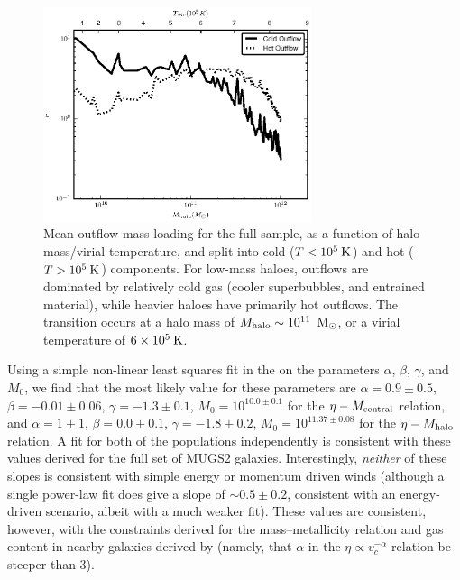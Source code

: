 \begin{figure}
    \includegraphics[width=0.7\textwidth]{figures3/coldmassloading.eps}
    \caption[Outflow mass loading for cold and hot gas]{Mean outflow mass loading for the full sample, as a function of
    halo mass/virial temperature, and split into cold ($T<10^5\>{\rm K}$) and hot
    ($T>10^5\>{\rm K}$) components.  For low-mass haloes, outflows are dominated by
    relatively cold gas (cooler superbubbles, and entrained material), while heavier
    haloes have primarily hot outflows.  The transition occurs at a halo mass of
    $M_{\rm halo}\sim10^{11}\;\>{\rm M_{\odot}}$, or a virial temperature of $6\times10^5\>{\rm K}$.}
    \label{coldmassloading}
\end{figure}

Using a simple non-linear least squares fit in the on the parameters $\alpha$,
$\beta$, $\gamma$, and $M_0$, we find that the most likely value for these
parameters are $\alpha=0.9\pm0.5$, $\beta=-0.01\pm0.06$, $\gamma=-1.3\pm0.1$,
$M_{0}=10^{10.0\pm0.1}$ for the $\eta-M_{\rm central}$ relation, and $\alpha=1\pm1$,
$\beta=0.0\pm0.1$, $\gamma=-1.8\pm0.2$, $M_{0}=10^{11.37\pm0.08}$ for the
$\eta-M_{\rm halo}$ relation.  A fit for both of the populations independently is
consistent with these values derived for the full set of MUGS2 galaxies.
Interestingly, {\it neither} of these slopes is consistent with simple energy
or momentum driven winds (although a single power-law fit does give a slope of
$\sim0.5\pm0.2$, consistent with an energy-driven scenario, albeit with a much
weaker fit).  These values are consistent, however, with the constraints derived
for the mass--metallicity relation and gas content in nearby galaxies derived by
\citet{Peeples2011} (namely, that $\alpha$ in the $\eta\propto v_c^{-\alpha}$
relation be steeper than 3).

